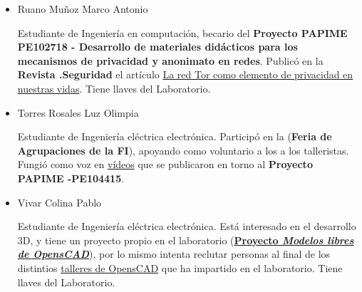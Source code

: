 \documentclass[a4paper,11pt]{article}                 %
\begin{document}
\begin{itemize}
    \item Ruano Muñoz Marco Antonio
    
    Estudiante de Ingeniería en computación, becario del \textbf{Proyecto PAPIME PE102718 - Desarrollo de materiales didácticos para los mecanismos de privacidad y anonimato en redes}. Publicó en la \textbf{Revista .Seguridad} el artículo \href{https://revista.seguridad.unam.mx/numero30/la-red-tor-como-elemento-de-privacidad-en-nuestras-vidas}{La red Tor como elemento de privacidad en nuestras vidas}. Tiene llaves del Laboratorio.
    
    \item Torres Rosales Luz Olimpia
    
    Estudiante de Ingeniería eléctrica electrónica. Participó en la (\textbf{Feria de Agrupaciones de la FI}), apoyando como voluntario a los a los talleristas. Fungió como voz en \href{https://www.youtube.com/channel/UCwHFqMqxUcCAJSdek3e4zOw}{vídeos} que se publicaron en torno al  \textbf{Proyecto PAPIME -PE104415}.
    
    \item Vivar Colina Pablo
    
    Estudiante de Ingeniería eléctrica electrónica. Está interesado en el desarrollo 3D, y tiene un proyecto propio en el laboratorio (\href{https://github.com/LIDSOL/OpenSCAD-free-models}{\textbf{Proyecto \textit{Modelos libres de OpensCAD}}}), por lo mismo intenta reclutar personas al final de los distintios \href{https://github.com/LIDSOL/OpenSCAD-curso}{talleres de OpensCAD} que ha impartido en el laboratorio. Tiene llaves del Laboratorio.
  \end{itemize}
  
\end{document}
